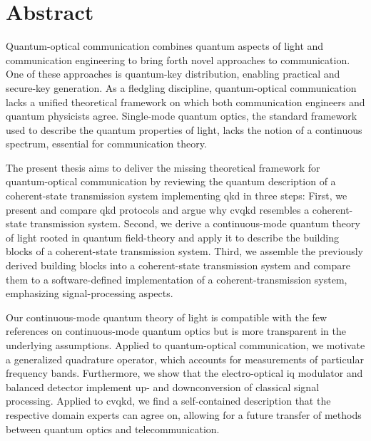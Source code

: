 \section*{Abstract}

Quantum-optical communication combines quantum aspects of light and communication engineering to bring forth novel approaches to communication.
One of these approaches is quantum-key distribution, enabling practical and secure-key generation.
As a fledgling discipline, quantum-optical communication lacks a unified theoretical framework on which both communication engineers and quantum physicists agree.
Single-mode quantum optics, the standard framework used to describe the quantum properties of light, lacks the notion of a continuous spectrum, essential for communication theory.

The present thesis aims to deliver the missing theoretical framework for quantum-optical communication by reviewing the quantum description of a coherent-state transmission system implementing \gls{qkd} in three steps:
First, we present and compare \gls{qkd} protocols and argue why \gls{cvqkd} resembles a coherent-state transmission system.
Second, we derive a continuous-mode quantum theory of light rooted in quantum field-theory and apply it to describe the building blocks of a coherent-state transmission system.
Third, we assemble the previously derived building blocks into a coherent-state transmission system and compare them to a software-defined implementation of a coherent-transmission system, emphasizing signal-processing aspects.

Our continuous-mode quantum theory of light is compatible with the few references on continuous-mode quantum optics but is more transparent in the underlying assumptions.
Applied to quantum-optical communication, we motivate a generalized quadrature operator, which accounts for measurements of particular frequency bands.
Furthermore, we show that the electro-optical \gls{iq} modulator and balanced detector implement up- and downconversion of classical signal processing.
Applied to \gls{cvqkd}, we find a self-contained description that the respective domain experts can agree on, allowing for a future transfer of methods between quantum optics and telecommunication.